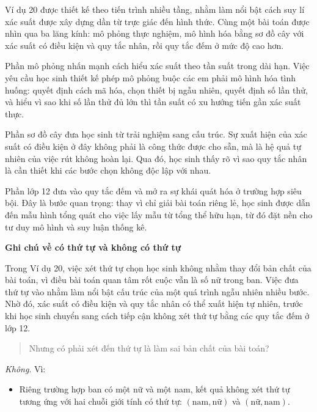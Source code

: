   {
    Ví dụ 20 được thiết kế theo tiến trình nhiều tầng, nhằm làm nổi bật cách suy lí xác suất được xây dựng dần từ trực giác đến hình thức. Cùng một bài toán được nhìn qua ba lăng kính: mô phỏng thực nghiệm, mô hình hóa bằng sơ đồ cây với xác suất có điều kiện và quy tắc nhân, rồi quy tắc đếm ở mức độ cao hơn.

    Phần mô phỏng nhấn mạnh cách hiểu xác suất theo tần suất trong dài hạn. Việc yêu cầu học sinh thiết kế phép mô phỏng buộc các em phải mô hình hóa tình huống: quyết định cách mã hóa, chọn thiết bị ngẫu nhiên, quyết định số lần thử, và hiểu vì sao khi số lần thử đủ lớn thì tần suất có xu hướng tiến gần xác suất thực.

    Phần sơ đồ cây đưa học sinh từ trải nghiệm sang cấu trúc. Sự xuất hiện của xác suất có điều kiện ở đây không phải là công thức được cho sẵn, mà là hệ quả tự nhiên của việc rút không hoàn lại. Qua đó, học sinh thấy rõ vì sao quy tắc nhân là cần thiết khi các bước chọn không độc lập với nhau.

    Phần lớp 12 đưa vào quy tắc đếm và mở ra sự khái quát hóa ở trường hợp siêu bội. Đây là bước quan trọng: thay vì chỉ giải bài toán riêng lẻ, học sinh được dẫn đến mẫu hình tổng quát cho việc lấy mẫu từ tổng thể hữu hạn, từ đó đặt nền cho tư duy mô hình và suy luận thống kê.\vspace{\baselineskip}

    \noindent
    \textbf{Ghi chú về có thứ tự và không có thứ tự}\vspace{\baselineskip}

    Trong Ví dụ 20, việc xét thứ tự chọn học sinh không nhằm thay đổi bản chất của bài toán, vì điều bài toán quan tâm rốt cuộc vẫn là số nữ trong ban. Việc đưa thứ tự vào nhằm làm nổi bật cấu trúc của một quá trình ngẫu nhiên nhiều bước. Nhờ đó, xác suất có điều kiện và quy tắc nhân có thể xuất hiện tự nhiên, trước khi học sinh chuyển sang cách tiếp cận không xét thứ tự bằng các quy tắc đếm ở lớp 12.

    \begin{quote}
      Nhưng có phải xét đến thứ tự là làm sai bản chất của bài toán?
    \end{quote}

    \vspace{0.3\baselineskip}
    \noindent
    \emph{Không}. Vì:

    \begin{itemize}
      \item Riêng trường hợp ban có một nữ và một nam, kết quả không xét thứ tự tương ứng với hai chuỗi giới tính có thứ tự: $(\text{nam}, \text{nữ})$ và $(\text{nữ}, \text{nam})$.


\end{itemize}}
